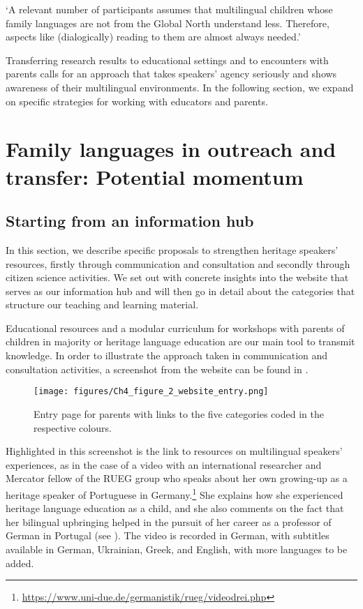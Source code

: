 \documentclass[output=paper,colorlinks,citecolor=brown]{langscibook}
\begin{document}
\trans `A relevant number of participants assumes that multilingual children whose family languages are not from the Global North understand less. Therefore, aspects like (dialogically) reading to them are almost always needed.'
\z

Transferring research results to educational settings and to encounters with parents calls for an approach that takes speakers’ agency seriously and shows awareness of their multilingual environments. In the following section, we expand on specific strategies for working with educators and parents.

\section{Family languages in outreach and transfer: Potential momentum} \label{sec:purkathoferetal:6}

\subsection{Starting from an information hub}

In this section, we describe specific proposals to strengthen heritage speakers’ resources, firstly through communication and consultation and secondly through citizen science activities. We set out with concrete insights into the website that serves as our information hub and will then go in detail about the categories that structure our teaching and learning material.

Educational resources and a modular curriculum for workshops with parents of children in majority or heritage language education are our main tool to transmit knowledge. In order to illustrate the approach taken in communication and consultation activities, a screenshot from the website can be found in .


\begin{figure}
    \texttt{[image: figures/Ch4\_figure\_2\_website\_entry.png]}
    \caption{Entry page for parents with links to the five categories coded in the respective colours.}
    \label{fig:purkarthoferetal:website-entry}
\end{figure}


Highlighted in this screenshot is the link to resources on multilingual speakers’ experiences, as in the case of a video with an international researcher and Mercator fellow of the RUEG group who speaks about her own growing-up as a heritage speaker of Portuguese in Germany.\footnote{\url{https://www.uni-due.de/germanistik/rueg/videodrei.php}} She explains how she experienced heritage language education as a child, and she also comments on the fact that her bilingual upbringing helped in the pursuit of her career as a professor of German in Portugal (see ). The video is recorded in German, with subtitles available in German, Ukrainian, Greek, and English, with more languages to be added.
\end{document}
